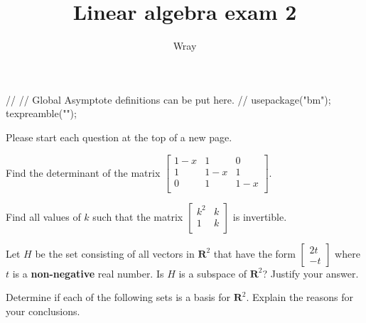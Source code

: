 \documentclass[12pt]{exam}
\title{Linear algebra exam 2}
\author{Wray}
\newcommand{\real}{\mathbf{R}}
\begin{document}
\begin{asydef}
//
// Global Asymptote definitions can be put here.
//
usepackage("bm");
texpreamble("\def\V#1{\bm{#1}}");
\end{asydef}

\bigskip
\bigskip

Please start each question at the top of a new page.
\bigskip

\begin{questions}

\question[7]
Find the determinant of the matrix 
$\left[ \begin{array}{ccc}
1 - x & 1 & 0 \\
1 & 1 - x & 1 \\
0 & 1 & 1 - x \\
\end{array} \right]$.

\smallskip

\question[5]
Find all values of $k$ such that the matrix 
$\left[ \begin{array}{cc}
k^2 & k \\ 1 & k \\
\end{array} \right]$
is invertible.

\question[10]
Let $H$ be the set consisting of all vectors in $\real^2$ that have the form 
$\left[ \begin{array}{c}
	2t \\ -t
\end{array} \right]$ where $t$ is a \textbf{non-negative} real number.  Is $H$ is a subspace of $\real^2$?  Justify your answer.

\question[15]
Determine if each of the following sets is a basis for $\real^2$.  Explain the reasons for your conclusions.

\begin{parts}
\part
$\left\lbrace \left[
\begin{array}{c}
5 \\ 1 
\end{array}
\right], 
\left[
\begin{array}{c}
0 \\ 0 
\end{array}
\right]
\right\rbrace$

\part
$\left\lbrace \left[
\begin{array}{c}
3 \\ -1 
\end{array}
\right], 
\left[
\begin{array}{c}
2 \\ 2 
\end{array}
\right]
\right\rbrace$


\end{parts}
\end{questions}
\end{document}

